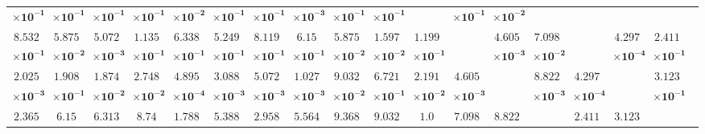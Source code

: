 \begin{table}[!ht]
{\begin{tabular}{|c|c|c|c|c|c|c|c|c|c|c|c|c|c|c|c|c|c|c|}
			$\mathbf{\times 10^{-1}}$ & $\mathbf{\times 10^{-1}}$ & $\mathbf{\times 10^{-1}}$ & $\mathbf{\times 10^{-1}}$ & $\mathbf{\times 10^{-2}}$ & $\mathbf{\times 10^{-1}}$ & $\mathbf{\times 10^{-1}}$ & $\mathbf{\times 10^{-3}}$ & $\mathbf{\times 10^{-1}}$ & $\mathbf{\times 10^{-1}}$ & & $\mathbf{\times 10^{-1}}$ & $\mathbf{\times 10^{-2}}$ & & & & & \multicolumn{2}{c}{} \\ \cline{1-17}
			$\mathbf{8.532}$ & $\mathbf{5.875}$ & $\mathbf{5.072}$ & $\mathbf{1.135}$ & $\mathbf{6.338}$ & $\mathbf{5.249}$ & $\mathbf{8.119}$ & $\mathbf{6.15}$ & $\mathbf{5.875}$ & $\mathbf{1.597}$ & $\mathbf{1.199}$ & \multirow{2}{*}{} & $\mathbf{4.605}$ & $\mathbf{7.098}$ & \multirow{2}{*}{} & $\mathbf{4.297}$ & $\mathbf{2.411}$ & \multicolumn{2}{c}{} \\ 
			$\mathbf{\times 10^{-1}}$ & $\mathbf{\times 10^{-2}}$ & $\mathbf{\times 10^{-3}}$ & $\mathbf{\times 10^{-1}}$ & $\mathbf{\times 10^{-1}}$ & $\mathbf{\times 10^{-1}}$ & $\mathbf{\times 10^{-1}}$ & $\mathbf{\times 10^{-1}}$ & $\mathbf{\times 10^{-2}}$ & $\mathbf{\times 10^{-2}}$ & $\mathbf{\times 10^{-1}}$ & & $\mathbf{\times 10^{-3}}$ & $\mathbf{\times 10^{-2}}$ & & $\mathbf{\times 10^{-4}}$ & $\mathbf{\times 10^{-1}}$ & \multicolumn{2}{c}{} \\ \cline{1-17}
			$\mathbf{2.025}$ & $\mathbf{1.908}$ & $\mathbf{1.874}$ & $\mathbf{2.748}$ & $\mathbf{4.895}$ & $\mathbf{3.088}$ & $\mathbf{5.072}$ & $\mathbf{1.027}$ & $\mathbf{9.032}$ & $\mathbf{6.721}$ & $\mathbf{2.191}$ & $\mathbf{4.605}$ & \multirow{2}{*}{} & $\mathbf{8.822}$ & $\mathbf{4.297}$ & \multirow{2}{*}{} & $\mathbf{3.123}$ & \multicolumn{2}{c}{} \\ 
			$\mathbf{\times 10^{-3}}$ & $\mathbf{\times 10^{-1}}$ & $\mathbf{\times 10^{-2}}$ & $\mathbf{\times 10^{-2}}$ & $\mathbf{\times 10^{-4}}$ & $\mathbf{\times 10^{-3}}$ & $\mathbf{\times 10^{-3}}$ & $\mathbf{\times 10^{-3}}$ & $\mathbf{\times 10^{-2}}$ & $\mathbf{\times 10^{-1}}$ & $\mathbf{\times 10^{-2}}$ & $\mathbf{\times 10^{-3}}$ & & $\mathbf{\times 10^{-3}}$ & $\mathbf{\times 10^{-4}}$ & & $\mathbf{\times 10^{-1}}$ & \multicolumn{2}{c}{} \\ \cline{1-17}
			$\mathbf{2.365}$ & $\mathbf{6.15}$ & $\mathbf{6.313}$ & $\mathbf{8.74}$ & $1.788$ & $5.388$ & $\mathbf{2.958}$ & $\mathbf{5.564}$ & $\mathbf{9.368}$ & $\mathbf{9.032}$ & \multirow{2}{*}{$\mathbf{1.0}$} & $\mathbf{7.098}$ & $\mathbf{8.822}$ & \multirow{2}{*}{} & $\mathbf{2.411}$ & $\mathbf{3.123}$ & \multirow{2}{*}{} & \multicolumn{2}{c}{} \\ 

\end{tabular}}
\end{table}
